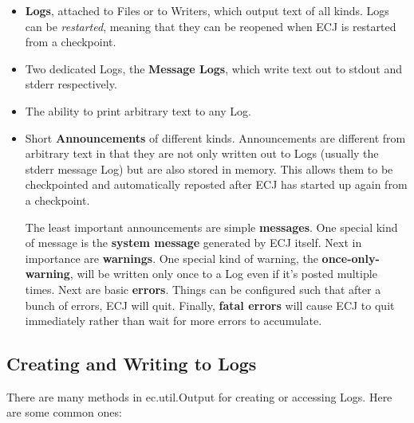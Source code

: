 \documentclass[twoside,10pt]{book}
\newcommand\class[1]{\index{#1}\textsf{#1}}
\begin{document}
\begin{itemize}
\item {\bf Logs}, attached to Files or to Writers, which output text of all kinds.  Logs can be {\it restarted}, meaning that they can be reopened when ECJ is restarted from a checkpoint.  
\item Two dedicated Logs, the {\bf Message Logs}, which write text out to stdout and stderr respectively. 
\item The ability to print arbitrary text to any Log.
\item Short {\bf Announcements} of different kinds.  Announcements are different from arbitrary text in that they are not only written out to Logs (usually the stderr message Log) but are also stored in memory.  This allows them to be checkpointed and automatically reposted after ECJ has started up again from a checkpoint.

The least important announcements are simple {\bf messages}.  One special kind of message is the {\bf system message} generated by ECJ itself.  Next in importance are {\bf warnings}.  One special kind of warning, the {\bf once-only-warning}, will be written only once to a Log even if it's posted multiple times.  Next are basic {\bf errors}.  Things can be configured such that after a bunch of errors, ECJ will quit.  Finally, {\bf fatal errors} will cause ECJ to quit immediately rather than wait for more errors to accumulate.
\end{itemize}

\subsection{Creating and Writing to Logs}

There are many methods in \class{ec.util.Output} for creating or accessing Logs.  Here are some common ones:
\end{document}
